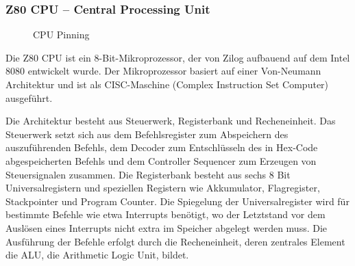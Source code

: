 \subsubsection{Z80 CPU -- Central Processing Unit}
\begin{figure}[H]
    \qquad
    \qquad
    \caption[Z80 CPU Pinning]{CPU Pinning}
    \label{fig:z80-cpu-pinning}
\end{figure}

Die Z80 CPU ist ein 8-Bit-Mikroprozessor, der von Zilog aufbauend auf dem Intel 8080 entwickelt wurde. Der Mikroprozessor basiert auf einer Von-Neumann Architektur und ist als CISC-Maschine (Complex Instruction Set Computer) ausgeführt.

Die Architektur besteht aus Steuerwerk, Registerbank und Recheneinheit. Das Steuerwerk setzt sich aus dem Befehlsregister zum Abspeichern des auszuführenden Befehls, dem Decoder zum Entschlüsseln des in Hex-Code abgespeicherten Befehls und dem Controller Sequencer zum Erzeugen von Steuersignalen zusammen. Die Registerbank besteht aus sechs 8 Bit Universalregistern und speziellen Registern wie Akkumulator, Flagregister, Stackpointer und Program Counter. Die Spiegelung der Universalregister wird für bestimmte Befehle wie etwa Interrupts benötigt, wo der Letztstand vor dem Auslösen eines Interrupts nicht extra im Speicher abgelegt werden muss. Die Ausführung der Befehle erfolgt durch die Recheneinheit, deren zentrales Element die ALU, die Arithmetic Logic Unit, bildet.

